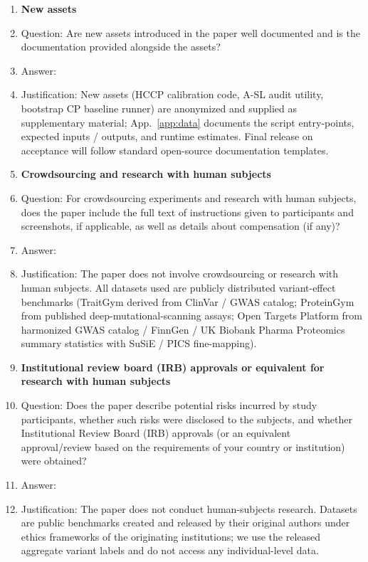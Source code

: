 \begin{enumerate}
\item {\bf New assets}
    \item[] Question: Are new assets introduced in the paper well documented and is the documentation provided alongside the assets?
    \item[] Answer: \answerYes{}
    \item[] Justification: New assets (HCCP calibration code, A-SL audit utility, bootstrap CP baseline runner) are anonymized and supplied as supplementary material; App.~\ref{app:data} documents the script entry-points, expected inputs / outputs, and runtime estimates. Final release on acceptance will follow standard open-source documentation templates.

\item {\bf Crowdsourcing and research with human subjects}
    \item[] Question: For crowdsourcing experiments and research with human subjects, does the paper include the full text of instructions given to participants and screenshots, if applicable, as well as details about compensation (if any)?
    \item[] Answer: \answerNA{}
    \item[] Justification: The paper does not involve crowdsourcing or research with human subjects. All datasets used are publicly distributed variant-effect benchmarks (TraitGym derived from ClinVar / GWAS catalog; ProteinGym from published deep-mutational-scanning assays; Open Targets Platform from harmonized GWAS catalog / FinnGen / UK Biobank Pharma Proteomics summary statistics with SuSiE / PICS fine-mapping).

\item {\bf Institutional review board (IRB) approvals or equivalent for research with human subjects}
    \item[] Question: Does the paper describe potential risks incurred by study participants, whether such risks were disclosed to the subjects, and whether Institutional Review Board (IRB) approvals (or an equivalent approval/review based on the requirements of your country or institution) were obtained?
    \item[] Answer: \answerNA{}
    \item[] Justification: The paper does not conduct human-subjects research. Datasets are public benchmarks created and released by their original authors under ethics frameworks of the originating institutions; we use the released aggregate variant labels and do not access any individual-level data.


\end{enumerate}
